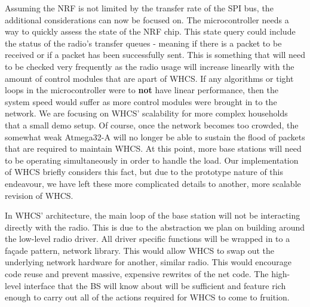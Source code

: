 Assuming the NRF is not limited by the transfer rate of the SPI bus, the
additional considerations can now be focused on. The microcontroller needs a
way to quickly assess the state of the NRF chip. This state query could include
the status of the radio's transfer queues - meaning if there is a packet to be
received or if a packet has been successfully sent. This is something that will
need to be checked very frequently as the radio usage will increase linearlly
with the amount of control modules that are apart of WHCS. If any algorithms or
tight loops in the microcontroller were to \textbf{not} have linear
performance, then the system speed would suffer as more control modules were
brought in to the network. We are focusing on WHCS' scalability for more
complex households that a small demo setup. Of course, once the network becomes
too crowded, the somewhat weak Atmega32-A will no longer be able to sustain the
flood of packets that are required to maintain WHCS. At this point, more base
stations will need to be operating simultaneously in order to handle the load.
Our implementation of WHCS briefly considers this fact, but due to the
prototype nature of this endeavour, we have left these more complicated details
to another, more scalable revision of WHCS.

In WHCS' architecture, the main loop of the base station will not be
interacting directly with the radio. This is due to the abstraction we plan on
building around the low-level radio driver. All driver specific functions will
be wrapped in to a fa\c{c}ade pattern, network library. This would allow WHCS
to swap out the underlying network hardware for another, similar radio. This
would encourage code reuse and prevent massive, expensive rewrites of the
net code. The high-level interface that the BS will know about will be
sufficient and feature rich enough to carry out all of the actions required for
WHCS to come to fruition.


